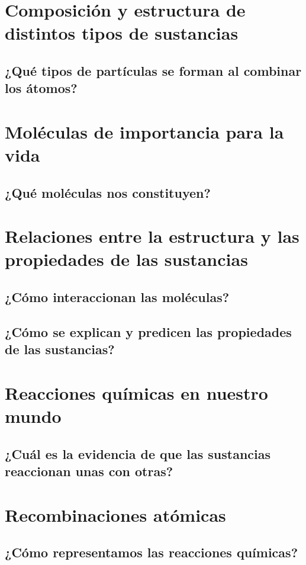 \documentclass[11pt]{book}
\begin{document}
\newpage
\section{Composición y estructura de distintos tipos de sustancias}
\subsection{¿Qué tipos de partículas se forman al combinar los átomos?}

\newpage
\section{Moléculas de importancia para la vida}
\subsection{¿Qué moléculas nos constituyen?}

\newpage
\section{Relaciones entre la estructura y las propiedades de las sustancias}
\subsection{¿Cómo interaccionan las moléculas?}
\subsection{¿Cómo se explican y predicen las propiedades de las sustancias?}

\newpage
\section{Reacciones químicas en nuestro mundo}
\subsection{¿Cuál es la evidencia de que las sustancias reaccionan unas con otras?}

\newpage
\section{Recombinaciones atómicas}
\subsection{¿Cómo representamos las reacciones químicas?}
\end{document}

